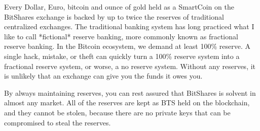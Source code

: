 Every Dollar, Euro, bitcoin and ounce of gold held as a SmartCoin on the
BitShares exchange is backed by up to twice the reserves of traditional
centralized exchanges. The traditional banking system has long practiced what
I like to call *fictional* reserve banking, more commonly known as fractional
reserve banking. In the Bitcoin ecosystem, we demand at least 100\% reserve. A
single hack, mistake, or theft can quickly turn a 100\% reserve system into a
fractional reserve system, or worse, a no reserve system. Without any
reserves, it is unlikely that an exchange can give you the funds it owes you.

By always maintaining reserves, you can rest assured that BitShares is solvent
in almost any market. All of the reserves are kept as BTS held on the
blockchain, and they cannot be stolen, because there are no private keys that
can be compromised to steal the reserves.
